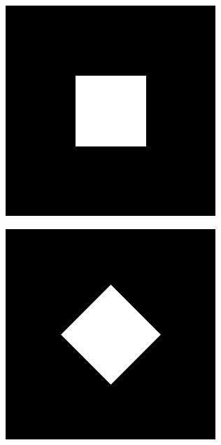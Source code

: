 \begin{figure}[htbp]
  \centering
  \begin{subfigure}[b]{0.2\textwidth}
    \centering
    \includegraphics[width=\textwidth]{figs/method/fourier/square_original.png}
    \vspace*{0.02\textwidth}
  \end{subfigure}%
  \hspace*{0.02\textwidth}
  \begin{subfigure}[b]{0.2\textwidth}
    \centering
    \includegraphics[width=\textwidth]{figs/method/fourier/square_45deg_original.png}

\end{subfigure}
\end{figure}
